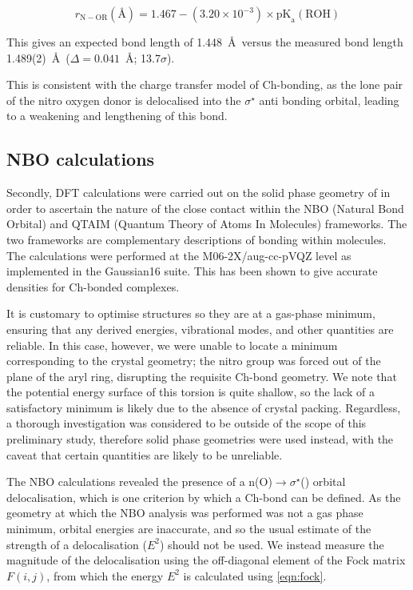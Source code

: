 \begin{refsection}
\begin{equation}
	r_{\mathrm{N-OR}} (\text{\AA}) = 1.467 - (3.20\times10^{-3}) \times \mathrm{pK}_{\mathrm{a}}(\mathrm{ROH})
	\label{eqn:scp}
\end{equation}

This gives an expected bond length of 1.448~\AA~versus the measured bond length 1.489(2)~\AA\ ($\Delta = 0.041$~\AA{}; 13.7$\sigma$).

This is consistent with the charge transfer model of Ch-bonding, as the lone pair of the nitro oxygen donor is delocalised into the $\sigma^{\star}$ anti bonding orbital, leading to a weakening and lengthening of this bond.\autocite{Reed1988}

\subsection{NBO calculations}
Secondly, DFT calculations were carried out on the solid phase geometry of  in order to ascertain the nature of the  close contact within the NBO (Natural Bond Orbital) and QTAIM (Quantum Theory of Atoms In Molecules) frameworks.\autocite{Bader1991,NBO7}
The two frameworks are complementary descriptions of bonding within molecules.
The calculations were performed at the M06-2X/aug-cc-pVQZ level as implemented in the Gaussian16 suite.\autocite{gaussian16,Zhao2008,Woon1995}
This has been shown to give accurate densities for Ch-bonded complexes.\autocite{Kim2019}

It is customary to optimise structures so they are at a gas-phase minimum, ensuring that any derived energies, vibrational modes, and other quantities are reliable.
In this case, however, we were unable to locate a minimum corresponding to the crystal geometry; the nitro group was forced out of the plane of the aryl ring, disrupting the requisite Ch-bond geometry.
We note that the potential energy surface of this torsion is quite shallow, so the lack of a satisfactory minimum is likely due to the absence of crystal packing.
Regardless, a thorough investigation was considered to be outside of the scope of this preliminary study, therefore solid phase geometries were used instead, with the caveat that certain quantities are likely to be unreliable.

The NBO calculations revealed the presence of a n(O)$\rightarrow \sigma^{\star}$() orbital delocalisation, which is one criterion by which a Ch-bond can be defined.\autocite{Pascoe2017}
As the geometry at which the NBO analysis was performed was not a gas phase minimum, orbital energies are inaccurate, and so the usual estimate of the strength of a delocalisation ($E^2$) should not be used.
We instead measure the magnitude of the delocalisation using the off-diagonal element of the Fock matrix $F(i,j)$, from which the energy $E^2$ is calculated using \cref{eqn:fock}.


\end{refsection}

